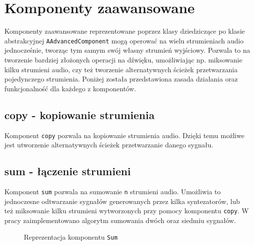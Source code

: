 \section{Komponenty zaawansowane}
Komponenty zaawansowane reprezentowane poprzez klasy dziedziczące po klasie abstrakcyjnej \texttt{AAdvancedComponent} mogą operować na wielu strumieniach audio jednocześnie, tworząc tym samym swój własny strumień wyjściowy. Pozwala to na tworzenie bardziej złożonych operacji na dźwięku, umożliwiając np. miksowanie kilku strumieni audio, czy też tworzenie alternatywnych ścieżek przetwarzania pojedynczego strumienia. Poniżej została przedstawiona zasada działania oraz funkcjonalność dla każdego z komponentów.

\subsection{copy - kopiowanie strumienia}
Komponent \texttt{copy} pozwala na kopiowanie strumienia audio. Dzięki temu możliwe jest utworzenie alternatywnych ścieżek przetwarzanie danego sygnału.

\subsection{sum - łączenie strumieni}
Komponent \texttt{sum} pozwala na sumowanie \texttt{n} strumieni audio. Umożliwia to jednoczesne odtwarzanie sygnałów generowanych przez kilka syntezatorów, lub też miksowanie kilku strumieni wytworzonych przy pomocy komponentu \texttt{copy}. W pracy zaimplementowano algorytm sumowania dwóch oraz siedmiu sygnałów.

\begin{figure}[H]
    \centering
    
    \caption{Reprezentacja komponentu \texttt{Sum}}
    \label{fig:Reprezentacja komponentu Sum}
\end{figure}